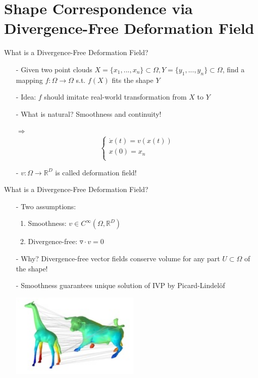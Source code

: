 \documentclass[xcolor=dvipsnames]{beamer}
\begin{document}
\section{Shape Correspondence via Divergence-Free Deformation Field}
\begin{frame}{What is a Divergence-Free Deformation Field?}
\begin{enumerate}
\item[-]Given two point clouds $X=\{x_1,...,x_n\} \subset \Omega, Y=\{y_1,...,y_n\}\subset \Omega$, find a mapping $f: \Omega \rightarrow \Omega$ s.t. $f(X)$ fits the shape $Y$
\item[-]Idea: $f$ should imitate real-world transformation from $X$ to $Y$
\item[-] What is natural? Smoothness and continuity!
\item[$\Rightarrow$]  \begin{equation*}
  	\begin{cases}
    \dot{x}(t) = v(x(t)) \\
    x(0) = x_n \\
    \end{cases}
    \end{equation*}
\item[-] $v: \Omega \rightarrow \mathbb{R}^D$ is called deformation field!
\end{enumerate}
\end{frame}
\begin{frame}{What is a Divergence-Free Deformation Field?}
\begin{enumerate}
\item[-]Two assumptions:
\begin{enumerate}
	\item Smoothness: $v \in C^\infty(\Omega, \mathbb{R}^D)$
	\item Divergence-free: $\triangledown\cdot v = 0 $
\end{enumerate}
\item[-]Why? Divergence-free vector fields conserve volume for any part $U \subset \Omega$ of the shape!
\item[-]Smoothness guarantees unique solution of IVP by Picard-Lindelöf
\begin{center}
\includegraphics[height=4cm]{Pictures/badCorrespondence.png}
\end{center}
\end{enumerate}
\end{frame}
\end{document}
